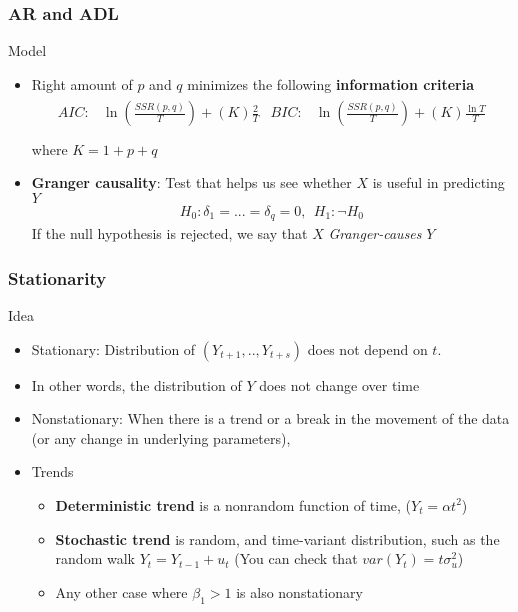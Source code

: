 \begin{frame}
\frametitle{AR and ADL}
Model
\begin{itemize}
\item Right amount of $p$ and $q$ minimizes the following \textbf{information criteria}
\begin{align*}
\begin{aligned}
AIC:& \ln\left(\frac{SSR(p,q)}{T}\right)+(K)\frac{2}{T}&
BIC:& \ln\left(\frac{SSR(p,q)}{T}\right)+(K)\frac{\ln{T}}{T}\\
\end{aligned}
\end{align*}
where $K=1+p+q$
\item \textbf{Granger causality}: Test that helps us see whether $X$ is useful in predicting $Y$
\begin{align*}
H_{0}: \delta_{1} = ... = \delta_q=0, \ \ H_{1}: \lnot H_{0}
\end{align*}
If the null hypothesis is rejected, we say that $X$ \textit{Granger-causes} $Y$
\end{itemize}
\end{frame}


\begin{frame}
\frametitle{Stationarity}
Idea
\begin{itemize}
\item Stationary: Distribution of $(Y_{t+1},..,Y_{t+s})$ does not depend on $t$. 
\item In other words, the distribution of $Y$ does not change over time
\item Nonstationary:  When there is a trend or a break in the movement of the data (or any change in underlying parameters), 
\item Trends
\begin{itemize}
\item \textbf{Deterministic trend} is a nonrandom  function of time, ($Y_t = \alpha t^{2}$)
\item \textbf{Stochastic trend} is random, and time-variant distribution, such as the random walk $Y_t = Y_{t-1}+u_t$  (You can check that $var(Y_t)=t\sigma_u^{2}$)
\item Any other case where $\beta_{1}>1$ is also nonstationary
\end{itemize} 
\end{itemize}
\end{frame}


